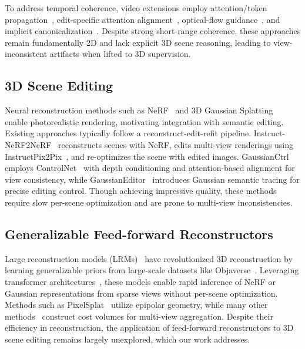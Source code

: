 To address temporal coherence, video extensions employ attention/token propagation~\cite{geyer2023tokenflowconsistentdiffusionfeatures}, edit-specific attention alignment~\cite{qi2023fatezerofusingattentionszeroshot,liu2023videop2pvideoeditingcrossattention}, optical-flow guidance~\cite{yang2023rerendervideozeroshottextguided}, and implicit canonicalization~\cite{ouyang2024codefcontentdeformationfields}. Despite strong short-range coherence, these approaches remain fundamentally 2D and lack explicit 3D scene reasoning, leading to view-inconsistent artifacts when lifted to 3D supervision.

\subsection{3D Scene Editing}
Neural reconstruction methods such as NeRF~\cite{nerf} and 3D Gaussian Splatting~\cite{3dgs} enable photorealistic rendering, motivating integration with semantic editing. Existing approaches typically follow a reconstruct-edit-refit pipeline. Instruct-NeRF2NeRF~\cite{in2n} reconstructs scenes with NeRF, edits multi-view renderings using InstructPix2Pix~\cite{ip2p}, and re-optimizes the scene with edited images. GaussianCtrl~\cite{gaussctrl} employs ControlNet~\cite{controlnet} with depth conditioning and attention-based alignment for view consistency, while GaussianEditor~\cite{gaussianeditor} introduces Gaussian semantic tracing for precise editing control. Though achieving impressive quality, these methods require slow per-scene optimization and are prone to multi-view inconsistencies.

\subsection{Generalizable Feed-forward Reconstructors}
Large reconstruction models (LRMs)~\cite{mvsnerf, pixelsplat, mvsplat, noposplat, gslrm, lgm, splatter_image, lsm} have revolutionized 3D reconstruction by learning generalizable priors from large-scale datasets like Objaverse~\cite{objaverse}. Leveraging transformer architectures~\cite{transformer, vit}, these models enable rapid inference of NeRF or Gaussian representations from sparse views without per-scene optimization. Methods such as PixelSplat~\cite{pixelsplat} utilize epipolar geometry, while many other methods~\cite{mvsnerf, murf, mvsplat, mvsplat360} construct cost volumes for multi-view aggregation. Despite their efficiency in reconstruction, the application of feed-forward reconstructors to 3D scene editing remains largely unexplored, which our work addresses.